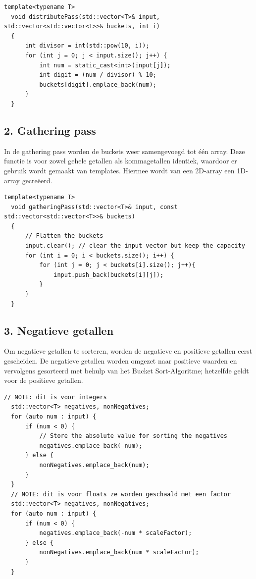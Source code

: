 \documentclass{article}
\begin{document}
\begin{lstlisting}[caption={Distribution pass}, label={lst:distribution}]
  template<typename T>
  void distributePass(std::vector<T>& input, std::vector<std::vector<T>>& buckets, int i)
  {   
      int divisor = int(std::pow(10, i));
      for (int j = 0; j < input.size(); j++) {
          int num = static_cast<int>(input[j]);
          int digit = (num / divisor) % 10;
          buckets[digit].emplace_back(num);
      }
  }
\end{lstlisting}
\subsection*{2. Gathering pass}
In de gathering pass worden de buckets weer samengevoegd tot één array. Deze functie is voor zowel gehele getallen als kommagetallen identiek, 
waardoor er gebruik wordt gemaakt van templates. Hiermee wordt van een 2D-array een 1D-array gecreëerd.

\newpage
\begin{lstlisting}[caption={Gathering pass}, label={lst:gathering}]
  template<typename T>
  void gatheringPass(std::vector<T>& input, const std::vector<std::vector<T>>& buckets)
  {       
      // Flatten the buckets
      input.clear(); // clear the input vector but keep the capacity
      for (int i = 0; i < buckets.size(); i++) {
          for (int j = 0; j < buckets[i].size(); j++){
              input.push_back(buckets[i][j]);
          }
      }
  }
\end{lstlisting}
\subsection*{3. Negatieve getallen}
Om negatieve getallen te sorteren, worden de negatieve en positieve getallen eerst gescheiden.  
De negatieve getallen worden omgezet naar positieve waarden en vervolgens gesorteerd met behulp van het Bucket Sort-Algoritme; 
hetzelfde geldt voor de positieve getallen.
\begin{lstlisting}[caption={Negatieve getallen}, label={lst:negatives}]
  // NOTE: dit is voor integers
  std::vector<T> negatives, nonNegatives;
  for (auto num : input) {
      if (num < 0) {
          // Store the absolute value for sorting the negatives
          negatives.emplace_back(-num);
      } else {
          nonNegatives.emplace_back(num);
      }
  }
  // NOTE: dit is voor floats ze worden geschaald met een factor
  std::vector<T> negatives, nonNegatives;
  for (auto num : input) {
      if (num < 0) {
          negatives.emplace_back(-num * scaleFactor);
      } else {
          nonNegatives.emplace_back(num * scaleFactor);
      }
  }
\end{lstlisting}
\end{document}
